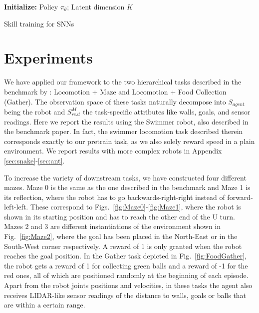\documentclass{article} %
\begin{document}
\begin{algorithm2e}[H]
\SetAlgoLined
 \textbf{Initialize: }{Policy $\pi_{\theta}$; Latent dimension $K$}\;
 \caption{Skill training for SNNs}
 \label{alg:overall}
\end{algorithm2e}


\section{Experiments}
\label{sec:experiments}
We have applied our framework to the two hierarchical tasks described in the benchmark by \cite{duan2016benchmarking}: Locomotion + Maze and Locomotion + Food Collection (Gather). The observation space of these tasks naturally decompose into $S_{agent}$ being the robot and $S_{rest}^M$ the task-specific attributes like walls, goals, and sensor readings. Here we report the results using the Swimmer robot, also described in the benchmark paper. In fact, the swimmer locomotion task described therein corresponds exactly to our pretrain task, as we also solely reward speed in a plain environment. We report results with more complex robots in Appendix \ref{sec:snake}-\ref{sec:ant}.

To increase the variety of downstream tasks, we have constructed four different mazes. Maze 0 is the same as the one described in the benchmark \citep{duan2016benchmarking} and Maze 1 is its reflection, where the robot has to go backwards-right-right instead of forward-left-left. These correspond to  Figs.\ \ref{fig:Maze0}-\ref{fig:Maze1}, where the robot is shown in its starting position and has to reach the other end of the U turn. Mazes 2 and 3 are different instantiations of the environment shown in Fig.\ \ref{fig:Maze2}, where the goal has been placed in the North-East or in the South-West corner respectively. A reward of 1 is only granted when the robot reaches the goal position. In the Gather task depicted in Fig.\ \ref{fig:FoodGather}, the robot gets a reward of 1 for collecting green balls and a reward of -1 for the red ones, all of which are positioned randomly at the beginning of each episode. Apart from the robot joints positions and velocities, in these tasks the agent also receives LIDAR-like sensor readings of the distance to walls, goals or balls that are within a certain range. 
\end{document}

